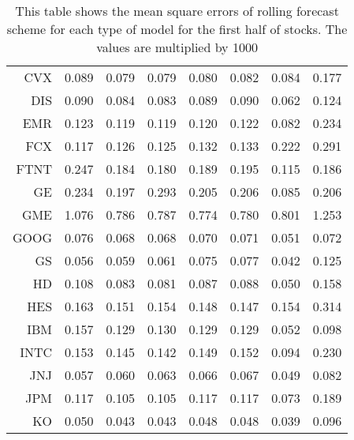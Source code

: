 \begin{table}[ht]
\begin{tabular}{rrrrrrrr}
  CVX & 0.089 & 0.079 & 0.079 & 0.080 & 0.082 & 0.084 & 0.177 \\ 
  DIS & 0.090 & 0.084 & 0.083 & 0.089 & 0.090 & 0.062 & 0.124 \\ 
  EMR & 0.123 & 0.119 & 0.119 & 0.120 & 0.122 & 0.082 & 0.234 \\ 
  FCX & 0.117 & 0.126 & 0.125 & 0.132 & 0.133 & 0.222 & 0.291 \\ 
  FTNT & 0.247 & 0.184 & 0.180 & 0.189 & 0.195 & 0.115 & 0.186 \\ 
  GE & 0.234 & 0.197 & 0.293 & 0.205 & 0.206 & 0.085 & 0.206 \\ 
  GME & 1.076 & 0.786 & 0.787 & 0.774 & 0.780 & 0.801 & 1.253 \\ 
  GOOG & 0.076 & 0.068 & 0.068 & 0.070 & 0.071 & 0.051 & 0.072 \\ 
  GS & 0.056 & 0.059 & 0.061 & 0.075 & 0.077 & 0.042 & 0.125 \\ 
  HD & 0.108 & 0.083 & 0.081 & 0.087 & 0.088 & 0.050 & 0.158 \\ 
  HES & 0.163 & 0.151 & 0.154 & 0.148 & 0.147 & 0.154 & 0.314 \\ 
  IBM & 0.157 & 0.129 & 0.130 & 0.129 & 0.129 & 0.052 & 0.098 \\ 
  INTC & 0.153 & 0.145 & 0.142 & 0.149 & 0.152 & 0.094 & 0.230 \\ 
  JNJ & 0.057 & 0.060 & 0.063 & 0.066 & 0.067 & 0.049 & 0.082 \\ 
  JPM & 0.117 & 0.105 & 0.105 & 0.117 & 0.117 & 0.073 & 0.189 \\ 
  KO & 0.050 & 0.043 & 0.043 & 0.048 & 0.048 & 0.039 & 0.096 \\ 
   \hline
\end{tabular}
\caption[MSE rolling forecast (1)]{This table shows the mean square errors of rolling forecast scheme for each type of model for the first half of stocks. 
                     The values are multiplied by 1000} 
\label{Table:MSE_r_1}
\end{table}
